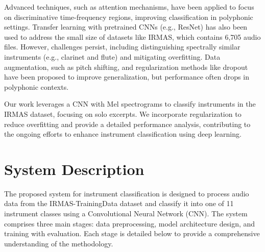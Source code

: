 \documentclass[conference]{IEEEtran}
\begin{document}
Advanced techniques, such as attention mechanisms, have been applied to focus on discriminative time-frequency regions, improving classification in polyphonic settings. Transfer learning with pretrained CNNs (e.g., ResNet) has also been used to address the small size of datasets like IRMAS, which contains 6,705 audio files. However, challenges persist, including distinguishing spectrally similar instruments (e.g., clarinet and flute) and mitigating overfitting. Data augmentation, such as pitch shifting, and regularization methods like dropout have been proposed to improve generalization, but performance often drops in polyphonic contexts.

Our work leverages a CNN with Mel spectrograms to classify instruments in the IRMAS dataset, focusing on solo excerpts. We incorporate regularization to reduce overfitting and provide a detailed performance analysis, contributing to the ongoing efforts to enhance instrument classification using deep learning.
\section{System Description}
The proposed system for instrument classification is designed to process audio data from the IRMAS-TrainingData dataset and classify it into one of 11 instrument classes using a Convolutional Neural Network (CNN). The system comprises three main stages: data preprocessing, model architecture design, and training with evaluation. Each stage is detailed below to provide a comprehensive understanding of the methodology.
\end{document}
